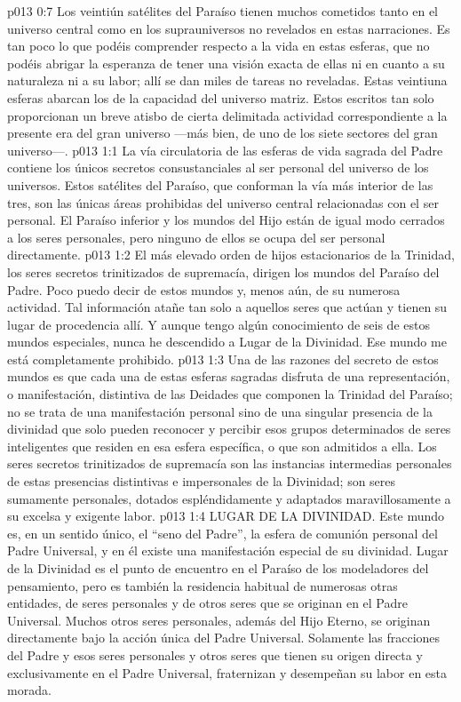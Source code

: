 \vs p013 0:7 Los veintiún satélites del Paraíso tienen muchos cometidos tanto en el universo central como en los suprauniversos no revelados en estas narraciones. Es tan poco lo que podéis comprender respecto a la vida en estas esferas, que no podéis abrigar la esperanza de tener una visión exacta de ellas ni en cuanto a su naturaleza ni a su labor; allí se dan miles de tareas no reveladas. Estas veintiuna esferas abarcan los  de la capacidad del universo matriz. Estos escritos tan solo proporcionan un breve atisbo de cierta delimitada actividad correspondiente a la presente era del gran universo ---más bien, de uno de los siete sectores del gran universo---.
\vs p013 1:1 La vía circulatoria de las esferas de vida sagrada del Padre contiene los únicos secretos consustanciales al ser personal del universo de los universos. Estos satélites del Paraíso, que conforman la vía más interior de las tres, son las únicas áreas prohibidas del universo central relacionadas con el ser personal. El Paraíso inferior y los mundos del Hijo están de igual modo cerrados a los seres personales, pero ninguno de ellos se ocupa del ser personal directamente.
\vs p013 1:2 El más elevado orden de hijos estacionarios de la Trinidad, los seres secretos trinitizados de supremacía, dirigen los mundos del Paraíso del Padre. Poco puedo decir de estos mundos y, menos aún, de su numerosa actividad. Tal información atañe tan solo a aquellos seres que actúan y tienen su lugar de procedencia allí. Y aunque tengo algún conocimiento de seis de estos mundos especiales, nunca he descendido a Lugar de la Divinidad. Ese mundo me está completamente prohibido.
\vs p013 1:3 Una de las razones del secreto de estos mundos es que cada una de estas esferas sagradas disfruta de una representación, o manifestación, distintiva de las Deidades que componen la Trinidad del Paraíso; no se trata de una manifestación personal sino de una singular presencia de la divinidad que solo pueden reconocer y percibir esos grupos determinados de seres inteligentes que residen en esa esfera específica, o que son admitidos a ella. Los seres secretos trinitizados de supremacía son las instancias intermedias personales de estas presencias distintivas e impersonales de la Divinidad; son seres sumamente personales, dotados espléndidamente y adaptados maravillosamente a su excelsa y exigente labor.
\vs p013 1:4 LUGAR DE LA DIVINIDAD. Este mundo es, en un sentido único, el “seno del Padre”, la esfera de comunión personal del Padre Universal, y en él existe una manifestación especial de su divinidad. Lugar de la Divinidad es el punto de encuentro en el Paraíso de los modeladores del pensamiento, pero es también la residencia habitual de numerosas otras entidades, de seres personales y de otros seres que se originan en el Padre Universal. Muchos otros seres personales, además del Hijo Eterno, se originan directamente bajo la acción única del Padre Universal. Solamente las fracciones del Padre y esos seres personales y otros seres que tienen su origen directa y exclusivamente en el Padre Universal, fraternizan y desempeñan su labor en esta morada.
